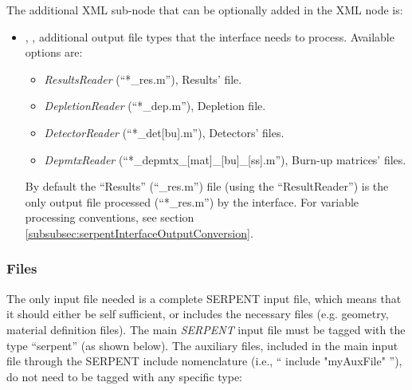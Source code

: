 The additional XML sub-node that can be optionally added in the  XML node is:
\begin{itemize}
   \item {}, ,  additional output file types 
                                                              that the interface needs to process.  
                                                              Available options are:  
                                                              \begin{itemize}
                                                                \item  \textit{ResultsReader} (``*\_res.m''), Results’ file.
                                                                \item  \textit{DepletionReader} (``*\_dep.m''), Depletion file.
                                                                 \item \textit{DetectorReader}  (``*\_det[bu].m''), Detectors’ files.
                                                                \item  \textit{DepmtxReader} (``*\_depmtx\_[mat]\_[bu]\_[ss].m''), Burn-up matrices’ files.
                                                              \end{itemize}
                                                              \nb By default  the ``Results'' (``\_res.m'') file (using the ``ResultReader'') is the 
                                                               only output file processed (``*\_res.m'') by the interface. 
                                                               For variable processing conventions, see section  
                                                               \ref{subsubsec:serpentInterfaceOutputConversion}.
\end{itemize}

\subsubsection{Files}
The only input file needed is a complete SERPENT input file,
which means that it should either be self sufficient, or includes
the necessary files (e.g. geometry, material definition files).
The main \textit{SERPENT} input file must be tagged with the
type ``serpent'' (as shown below). The auxiliary files, included in the
main input file through the SERPENT include nomenclature (i.e., `` include "myAuxFile" ''),
do not need to be tagged with any specific type:

